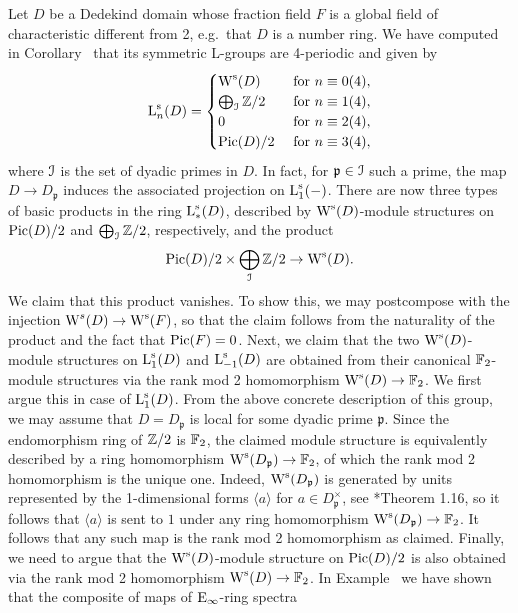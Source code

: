 \begin{example}
\label{example:L-rings-dedekind}%
Let $D$ be a Dedekind domain whose fraction field $F$ is a global field of characteristic different from 2, e.g.\ that $D$ is a number ring. We have computed in Corollary~ that its symmetric L-groups are 4-periodic and given by
\[
\operatorname L^{\mathrm{s}}_n(D) = \begin{cases} \operatorname W^{\mathrm{s}}(D) & \text{ for } n \equiv 0 (4),\\
						\bigoplus_{\mathcal{I}} \mathbb{Z}/2 & \text{ for } n \equiv 1 (4),\\
						0 & \text{ for } n \equiv 2 (4), \\
						\operatorname{Pic}(D)/2 & \text{ for } n \equiv 3 (4), \end{cases}
\]
where $\mathcal{I}$ is the set of dyadic primes in $D$. In fact, for $\mathfrak{p} \in \mathcal{I}$ such a prime, the map $D \to D_\mathfrak{p}$ induces the associated projection on $\operatorname L_1^{\mathrm{s}}(-)$. There are now three types of basic products in the ring $\operatorname L_\ast^{\mathrm{s}}(D)$, described by $\operatorname W^{\mathrm{s}}(D)$-module structures on $\operatorname{Pic}(D)/2$ and $\bigoplus_{\mathcal{I}} \mathbb{Z}/2$, respectively, and the product
\[
\operatorname{Pic}(D)/2 \times \bigoplus_{\mathcal{I}} \mathbb{Z}/2 \to \operatorname W^{\mathrm{s}}(D).
\]
We claim that this product vanishes. To show this, we may postcompose with the injection $\operatorname W^s(D) \to \operatorname W^{\mathrm{s}}(F)$, so that the claim follows from the naturality of the product and the fact that $\operatorname{Pic}(F) = 0$. Next, we claim that the two $\operatorname W^{\mathrm{s}}(D)$-module structures on $\operatorname L_{1}^{\mathrm{s}}(D)$ and $\operatorname L_{-1}^{\mathrm{s}}(D)$ are obtained from their canonical $\mathbb{F}_2$-module structures via the rank mod 2 homomorphism $\operatorname W^{\mathrm{s}}(D) \to \mathbb{F}_2$. We first argue this in case of $\operatorname L_1^{\mathrm{s}}(D)$. From the above concrete description of this group, we may assume that $D=D_\mathfrak{p}$ is local for some dyadic prime $\mathfrak{p}$. Since the endomorphism ring of $\mathbb{Z}/2$ is $\mathbb{F}_2$, the claimed module structure is equivalently described by a ring homomorphism $\operatorname W^{\mathrm{s}}(D_\mathfrak{p}) \to \mathbb{F}_2$, of which the rank mod 2 homomorphism is the unique one. Indeed, $\operatorname W^{\mathrm{s}}(D_{\mathfrak{p}})$ is generated by units represented by the 1-dimensional forms $\langle a \rangle$ for $a \in D_{\mathfrak{p}}^\times$, see \cite{knebusch-rosenberg-ware2}*{Theorem 1.16}, so it follows that $\langle a \rangle$ is sent to $1$ under any ring homomorphism $\operatorname W^{\mathrm{s}}(D_{\mathfrak{p}}) \to \mathbb{F}_2$. It follows that any such map is the rank mod 2 homomorphism as claimed.
Finally, we need to argue that the $\operatorname W^{\mathrm{s}}(D)$-module structure on $\operatorname{Pic}(D)/2$ is also obtained via the rank mod 2 homomorphism $\operatorname W^{\mathrm{s}}(D) \to \mathbb{F}_2$. In Example~ we have shown that the composite of maps of ${\mathrm{E}_{\infty}}$-ring spectra

\end{example}
